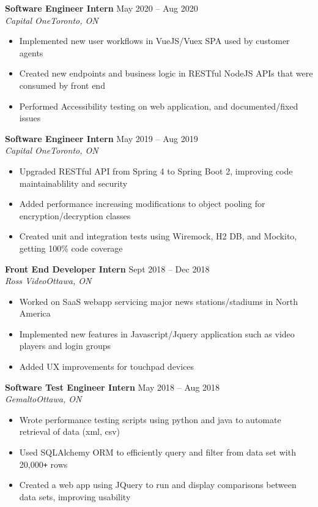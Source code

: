 \documentclass[letterpaper]{article}
\newcommand{\DatedEntry}[5]{\small\textbf{#1}
	\hfill \small{#2}\\
	\textit{#3}\hfill\textit{#4}\\\vspace{0.1cm}
	#5\vspace{0.1cm}
}
\begin{document}
\DatedEntry{Software Engineer Intern}
{May 2020 -- Aug 2020}
{Capital One}
{Toronto, ON}
{\begin{itemize}[nolistsep]
	\item Implemented new user workflows in VueJS/Vuex SPA used by customer agents
	\item Created new endpoints and business logic in RESTful NodeJS APIs that were consumed by front end
	\item Performed Accessibility testing on web application, and documented/fixed issues
\end{itemize}}
\DatedEntry{Software Engineer Intern}
{May 2019 -- Aug 2019}
{Capital One}
{Toronto, ON}
{\begin{itemize}[nolistsep]
	\item Upgraded RESTful API from Spring 4 to Spring Boot 2, improving code maintainablility and security
	\item Added performance increasing modifications to object pooling for encryption/decryption classes
	\item Created unit and integration tests using Wiremock, H2 DB, and Mockito, getting 100\% code coverage
\end{itemize}}
\DatedEntry{Front End Developer Intern}
{Sept 2018 -- Dec 2018}
{Ross Video}
{Ottawa, ON}
{\begin{itemize}[nolistsep]
	\item Worked on SaaS webapp servicing major news stations/stadiums in North America
	\item Implemented new features in Javascript/Jquery application such as video players and login groups
	\item Added UX improvements for touchpad devices
\end{itemize}}
\DatedEntry{Software Test Engineer Intern}
{May 2018 -- Aug 2018}
{Gemalto}
{Ottawa, ON}
{\begin{itemize}[nolistsep]
	\item Wrote performance testing scripts using python and java to automate retrieval of data (xml, csv)
	\item Used SQLAlchemy ORM to efficiently query and filter from data set with 20,000\texttt{+} rows
	\item Created a web app using JQuery to run and display comparisons between data sets, improving usability
\end{itemize}}\vspace{-0.3cm}
\end{document}
